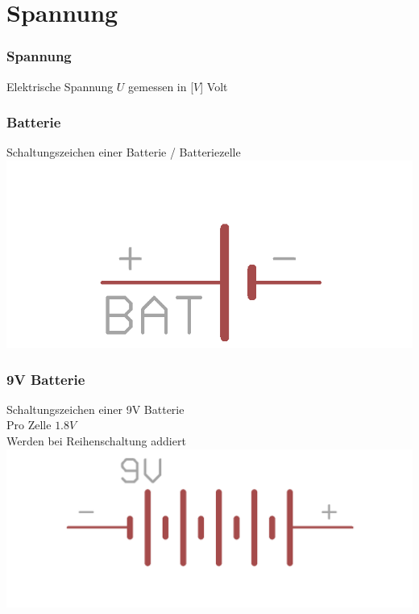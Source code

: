\section*{Spannung}

\begin{frame}
    \frametitle{Spannung}
    \begin{center}
        Elektrische Spannung $U$ gemessen in [$V$] Volt
	\end{center}
\end{frame}

\begin{frame}
    \frametitle{Batterie}
    \begin{center}
    Schaltungszeichen einer Batterie / Batteriezelle\\
        \includegraphics[width=.99\textwidth]{e02/batterieEagle.png}
	\end{center}
\end{frame}

\begin{frame}
    \frametitle{9V Batterie}
    \begin{center}
    Schaltungszeichen einer 9V Batterie\\
    Pro Zelle $1.8V$\\
    Werden bei Reihenschaltung addiert\\
        \includegraphics[width=.99\textwidth]{e02/9vBatEagle.png}
	\end{center}
\end{frame}

